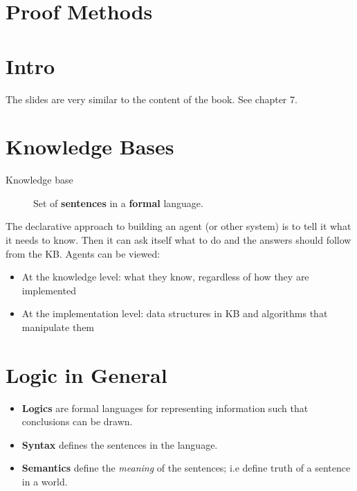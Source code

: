 \documentclass[11pt]{article}
\begin{document}
\section{Proof Methods}
\label{sec:org12fc565}

\maketitle
\tableofcontents


\section{Intro}
\label{sec:org8ac8ab8}
The slides are very similar to the content of the book.
See chapter 7.

\section{Knowledge Bases}
\label{sec:org21b6bcd}
\begin{description}
\item[{Knowledge base}] Set of \textbf{sentences} in a \textbf{formal} language.
\end{description}
The declarative approach to building an agent (or other system) is to tell it what it needs to know.
Then it can ask itself what to do and the answers should follow from the KB.
Agents can be viewed:
\begin{itemize}
\item At the knowledge level: what they know, regardless of how they are implemented
\item At the implementation level: data structures in KB and algorithms that manipulate them
\end{itemize}

\section{Logic in General}
\label{sec:org687c359}
\begin{itemize}
\item \textbf{Logics} are formal languages for representing information such that conclusions can be drawn.
\item \textbf{Syntax} defines the sentences in the language.
\item \textbf{Semantics} define the \emph{meaning} of the sentences; i.e define truth of a sentence in a world.
\end{itemize}
\end{document}
